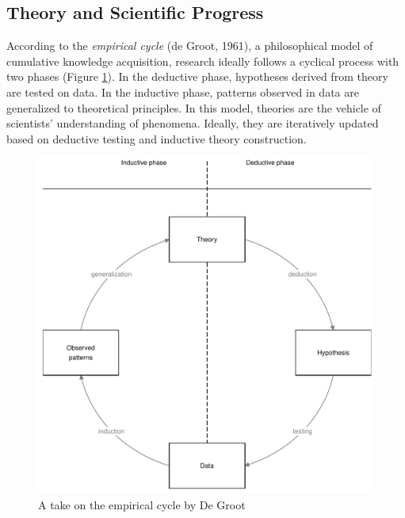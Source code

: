 \documentclass[
  man]{apa6}
\begin{document}
\subsection{Theory and Scientific Progress}\label{theory-and-scientific-progress}

According to the \emph{empirical cycle} (de Groot, 1961),
a philosophical model of cumulative knowledge acquisition,
research ideally follows a cyclical process with two phases (Figure \ref{fig:figec}).
In the deductive phase, hypotheses derived from theory are tested on data. In the inductive phase, patterns observed in data are generalized to theoretical principles.
In this model, theories are the vehicle of scientists' understanding of phenomena.
Ideally, they are iteratively updated based on deductive testing and inductive theory construction.

\begin{figure}
\centering
\includegraphics{empirical_cycle.pdf}
\caption{\label{fig:figec}A take on the empirical cycle by De Groot}
\end{figure}
\end{document}
